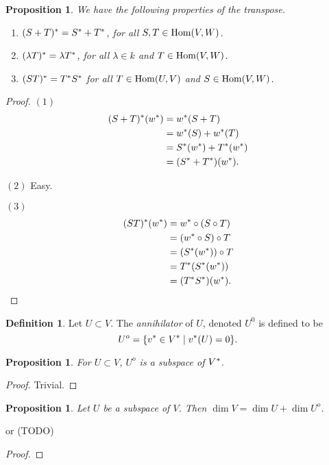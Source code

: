 \documentclass[12pt]{article}
\theoremstyle{definition}
\newtheorem{definition}{Definition}[section]
\theoremstyle{plain}
\newtheorem{proposition}[theorem] {Proposition}
\numberwithin{equation}{section}
\theoremstyle{definition}
\begin{document}
\begin{proposition}
We have the following properties of the transpose.
\begin{enumerate}
\item $ (S + T)^{*} = S^{*} + T^{*}$, for all $ S, T \in \operatorname{Hom}(V, W) $.
\item $ (\lambda T)^{*} = \lambda T^{*} $, for all $ \lambda \in k $ and $ T \in \operatorname{Hom}(V, W) $.
\item $ (S T)^{*} = T^{*} S^{*} $ for all $ T \in \operatorname{Hom}(U, V) $ and $ S \in \operatorname{Hom}(V, W) $.
\end{enumerate}
\end{proposition}

\begin{proof}
$ (1) $ 
\begin{align*}
	(S + T)^{*}(w^{*}) &= w^{*} (S + T)\\
	&= w^{*}(S) + w^{*}(T)\\
	&= S^{*}(w^{*}) + T^{*}(w^{*})\\
	&= (S^{*} + T^{*})(w^{*}).
\end{align*}

$ (2) $ Easy.

$ (3) $ 
\begin{align*}
	(ST)^{*}(w^{*}) &= w^{*} \circ (S \circ T)\\
	&= (w^{*} \circ S)\circ T\\
	&= (S^{*}(w^{*})) \circ T\\
	&= T^{*}(S^{*}(w^{*}))\\
	&= (T^{*} S^{*})(w^{*}).
\end{align*}
\end{proof}

\begin{definition}
Let $ U \subset V $. The \textit{annihilator} of $ U $, denoted $ U^0 $ is defined to be
\[ U^o = \{ v^{*} \in V^{*} \mid v^{*}(U) = 0 \}. \]
\end{definition}

\begin{proposition}
For $ U \subset V $, $ U^o $ is a subspace of $ V^{*} $.
\end{proposition}

\begin{proof}
Trivial.
\end{proof}

\begin{proposition} \label{ann_dim}
Let $ U $ be a subspace of $ V $. Then $ \dim V = \dim U + \dim U^o $.
\end{proposition}or 
(TODO)
\begin{proof}
\end{proof}
\end{document}
